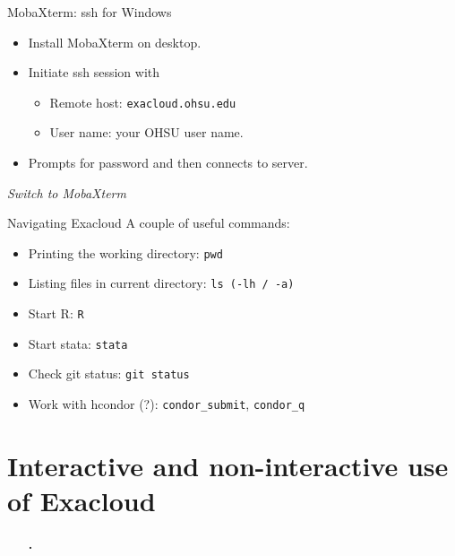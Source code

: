\documentclass[12pt,t,xcolor=table]{beamer}
\begin{document}
\begin{frame}[fragile,label={sec:orgheadline7}]{MobaXterm: ssh for Windows}
 \begin{itemize}
\item Install MobaXterm on desktop.

\item Initiate ssh session with 
\begin{itemize}
\item Remote host: \texttt{exacloud.ohsu.edu}
\item User name: your OHSU user name.
\end{itemize}

\item Prompts for password and then connects to server.
\end{itemize}


\emph{Switch to MobaXterm}
\end{frame}

\begin{frame}[fragile,label={sec:orgheadline8}]{Navigating Exacloud}
 A couple of useful commands:

\begin{itemize}
\item Printing the working directory: \texttt{pwd}

\item Listing files in current directory: \texttt{ls (-lh / -a)}

\item Start R: \texttt{R}

\item Start stata: \texttt{stata}

\item Check git status: \texttt{git status}

\item Work with hcondor (?): \texttt{condor\_submit}, \texttt{condor\_q}
\end{itemize}
\end{frame}
\section{Interactive and non-interactive use of Exacloud}
\label{sec:orgheadline17}
\begin{frame}[c]{}
  \begin{itemize}
    \item[\bf\thesection.] \bf\insertsection
  \end{itemize}          
\end{frame}
\end{document}
